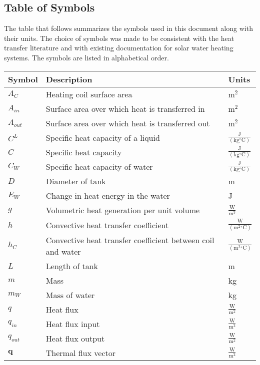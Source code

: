 \documentclass[12pt]{article}
\begin{document}
\subsection{Table of Symbols}
\label{Sec:ToS}
The table that follows summarizes the symbols used in this document along with their units. The choice of symbols was made to be consistent with the heat transfer literature and with existing documentation for solar water heating systems. The symbols are listed in alphabetical order.
\begin{longtabu}{l X[l] l}
\toprule
Symbol & Description & Units
\\
\midrule
${A_{C}}$ & Heating coil surface area & $\text{m}^{2}$
\\
${A_{in}}$ & Surface area over which heat is transferred in & $\text{m}^{2}$
\\
${A_{out}}$ & Surface area over which heat is transferred out & $\text{m}^{2}$
\\
${C^{L}}$ & Specific heat capacity of a liquid & $\frac{\text{J}}{(\text{kg}{}^{\circ}\text{C})}$
\\
$C$ & Specific heat capacity & $\frac{\text{J}}{(\text{kg}{}^{\circ}\text{C})}$
\\
${C_{W}}$ & Specific heat capacity of water & $\frac{\text{J}}{(\text{kg}{}^{\circ}\text{C})}$
\\
$D$ & Diameter of tank & m
\\
${E_{W}}$ & Change in heat energy in the water & J
\\
$g$ & Volumetric heat generation per unit volume & $\frac{\text{W}}{\text{m}^{3}}$
\\
$h$ & Convective heat transfer coefficient & $\frac{\text{W}}{(\text{m}^{2}{}^{\circ}\text{C})}$
\\
${h_{C}}$ & Convective heat transfer coefficient between coil and water & $\frac{\text{W}}{(\text{m}^{2}{}^{\circ}\text{C})}$
\\
$L$ & Length of tank & m
\\
$m$ & Mass & kg
\\
${m_{W}}$ & Mass of water & kg
\\
$q$ & Heat flux & $\frac{\text{W}}{\text{m}^{2}}$
\\
${q_{in}}$ & Heat flux input & $\frac{\text{W}}{\text{m}^{2}}$
\\
${q_{out}}$ & Heat flux output & $\frac{\text{W}}{\text{m}^{2}}$
\\
$\mathbf{q}$ & Thermal flux vector & $\frac{\text{W}}{\text{m}^{2}}$
\\

\end{longtabu}
\end{document}
